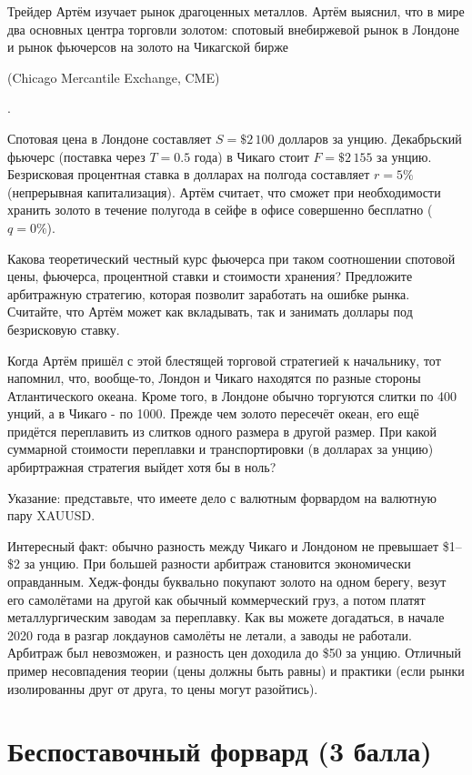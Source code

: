 \documentclass[a4paper,14pt]{extarticle}
\newcommand{\en}[1]{\begin{otherlanguage}{english}#1\end{otherlanguage}}
\begin{document}
Трейдер Артём изучает рынок драгоценных металлов. Артём выяснил, что в мире два основных центра торговли золотом: спотовый внебиржевой рынок в Лондоне и рынок фьючерсов на золото на Чикагской бирже \en{(Chicago Mercantile Exchange, CME)}. 

Спотовая цена в Лондоне составляет $S=\$2\,100$ долларов за унцию. Декабрьский фьючерс (поставка через $T=0.5$ года) в Чикаго стоит $F=\$2\,155$ за унцию. Безрисковая процентная ставка в долларах на полгода составляет $r=5\%$ (непрерывная капитализация). Артём считает, что сможет при необходимости хранить золото в течение полугода в сейфе в офисе совершенно бесплатно ($q=0\%$).

Какова теоретический честный курс фьючерса при таком соотношении спотовой цены, фьючерса, процентной ставки и стоимости хранения? Предложите арбитражную стратегию, которая позволит заработать на ошибке рынка. Считайте, что Артём может как вкладывать, так и занимать доллары под безрисковую ставку.

Когда Артём пришёл с этой блестящей торговой стратегией к начальнику, тот напомнил, что, вообще-то, Лондон и Чикаго находятся по разные стороны Атлантического океана. Кроме того, в Лондоне обычно торгуются слитки по 400 унций, а в Чикаго - по 1000. Прежде чем золото пересечёт океан, его ещё придётся переплавить из слитков одного размера в другой размер. При какой суммарной стоимости переплавки и транспортировки (в долларах за унцию) арбиртражная стратегия выйдет хотя бы в ноль?

Указание: представьте, что имеете дело с валютным форвардом на валютную пару XAUUSD.

Интересный факт: обычно разность между Чикаго и Лондоном не превышает \$1--\$2 за унцию. При большей разности арбитраж становится экономически оправданным. Хедж-фонды буквально покупают золото на одном берегу, везут его самолётами на другой как обычный коммерческий груз, а потом платят металлургическим заводам за переплавку. Как вы можете догадаться, в начале 2020 года в разгар локдаунов самолёты не летали, а заводы не работали. Арбитраж был невозможен, и разность цен доходила до \$50 за унцию. Отличный пример несовпадения теории (цены должны быть равны) и практики (если рынки изолированны друг от друга, то цены могут разойтись).

\section{Беспоставочный форвард (3 балла)}
\end{document}
